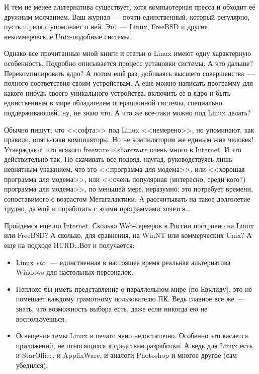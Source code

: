 И тем не менее альтернатива существует, хотя компьютерная пресса и обходит её дружным молчанием. Ваш журнал~--- почти единственный, который регулярно, пусть и редко, упоминает о ней. Это~--- Linux, FreeBSD и другие некоммерческие Unix-подобные системы.

Однако все прочитанные мной книги и статьи о Linux имеют одну характерную особенность. Подробно описывается процесс установки системы. А что дальше? Перекомпилировать ядро? А потом ещё раз, добиваясь высшего совершенства~--- полного соответствия своим устройствам. А ещё можно написать программу для какого-нибудь своего уникального устройства, включить её в ядро и быть единственным в мире обладателем операционной системы, специально поддерживающей\dots ну, не знаю что. А что же все-таки можно под Linux делать?

Обычно пишут, что <<софта>> под Linux <<немерено>>, но упоминают, как правило, опять-таки компиляторы. Но не компилятором же единым жив человек! Утверждают, что всякого freeware и shareware очень много в Internet. И это действительно так. Но скачивать все подряд, наугад, руководствуясь лишь невнятным указанием, что это <<программа для модема>>, или <<хорошая программа для модема>>, или <<очень популярная (интересно, среди кого?) программа для модема>>, по меньшей мере, неразумно: это потребует времени, сопоставимого с возрастом Метагалактики. А рассчитывать на такое долголетие трудно, да ещё и поработать с этими программами хочется\dots

Пройдемся еще по Internet. Сколько Web-серверов в России построено на Linux или FreeBSD? А сколько, для сравнения, на WinNT или коммерческих Unix? А еще на подходе HURD\dots Вот и получается:

\begin{itemize}
	\item Linux \textit{etc}.~--- единственная в настоящее время реальная альтернатива Windows для настольных персоналок. 
	\item Неплохо бы иметь представление о параллельном мире (по Евклиду), это не помешает каждому грамотному пользователю ПК. Ведь главное все же~--- знать, что возможность выбора есть, даже если никогда ею не воспользуешься. 
	\item Освещение темы Linux в печати явно недостаточно. Особенно это касается приложений, не относящихся к средствам разработки. А ведь для Linux есть и StarOffice, и ApplixWare, и аналоги Photoshop и многое другое (сам убедился). 
\end{itemize}

